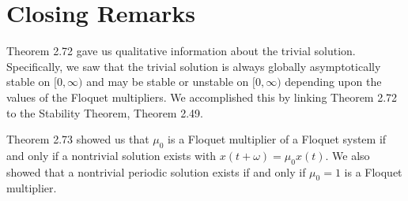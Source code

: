 \documentclass[a4paper]{article}
\begin{document}
\section{Closing Remarks}
Theorem 2.72 gave us qualitative information about the trivial solution. Specifically, we saw that the trivial solution is always globally asymptotically stable on $[0,\infty)$ and may be stable or unstable on $[0,\infty)$ depending upon the values of the Floquet multipliers. We accomplished this by linking Theorem 2.72 to the Stability Theorem, Theorem 2.49.

Theorem 2.73 showed us that $\mu_0$ is a Floquet multiplier of a Floquet system if and only if a nontrivial solution exists with $x(t+\omega) = \mu_0 x(t)$. We also showed that a nontrivial periodic solution exists if and only if $\mu_0 = 1$ is a Floquet multiplier. 
\end{document}
